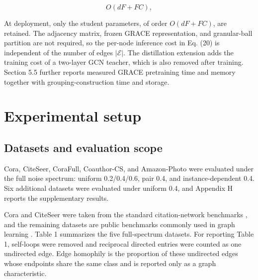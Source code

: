 \documentclass[10pt,letterpaper]{elsarticle}
\begin{document}
\begin{equation}\label{eq:20}
O(dF + FC),
\end{equation}

At deployment, only the student parameters, of order \(O(dF + FC)\), are retained. The adjacency matrix, frozen GRACE representation, and granular-ball partition are not required, so the per-node inference cost in Eq. (20) is independent of the number of edges \(|\mathcal{E}|\). The distillation extension adds the training cost of a two-layer GCN teacher, which is also removed after training. Section 5.5 further reports measured GRACE pretraining time and memory together with grouping-construction time and storage.

\Needspace{397pt}

\FloatBarrier

\section{Experimental setup}\label{sec:4}

\Needspace{397pt}

\subsection{Datasets and evaluation scope}\label{sec:4.1}

Cora, CiteSeer, CoraFull, Coauthor-CS, and Amazon-Photo were evaluated under the full noise spectrum: uniform 0.2/0.4/0.6, pair 0.4, and instance-dependent 0.4. Six additional datasets were evaluated under uniform 0.4, and Appendix H reports the supplementary results.

Cora and CiteSeer were taken from the standard citation-network benchmarks \cite{ref38}, and the remaining datasets are public benchmarks commonly used in graph learning \cite{ref39}. Table 1 summarizes the five full-spectrum datasets. For reporting Table 1, self-loops were removed and reciprocal directed entries were counted as one undirected edge. Edge homophily is the proportion of these undirected edges whose endpoints share the same class and is reported only as a graph characteristic.
\end{document}
